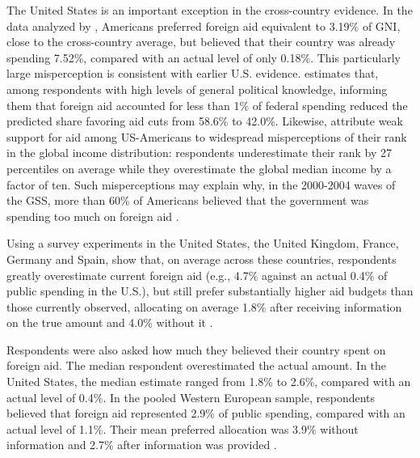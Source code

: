 \documentclass[11pt,a4paper]{article}
\begin{document}
The United States is an important exception in the cross-country evidence. In the data analyzed by \citet{kaufmann_foreign_2019}, Americans preferred foreign aid equivalent to 3.19\% of GNI, close to the cross-country average, but believed that their country was already spending 7.52\%, compared with an actual level of only 0.18\%. This particularly large misperception is consistent with earlier U.S. evidence. \citet{gilens_political_2001} estimates that, among respondents with high levels of general political knowledge, informing them that foreign aid accounted for less than 1\% of federal spending reduced the predicted share favoring aid cuts from 58.6\% to 42.0\%. Likewise, \citet{nair_misperceptions_2018} attribute weak support for aid among US-Americans to widespread misperceptions of their rank in the global income distribution: respondents underestimate their rank by 27 percentiles on average while they overestimate the global median income by a factor of ten. Such misperceptions may explain why, in the 2000-2004 waves of the GSS, more than 60\% of Americans believed that the government was spending too much on foreign aid \citep{okten_preferences_2007}.

Using a survey experiments in the United States, the United Kingdom, France, Germany and Spain, \citet{fabre_majority_2025} show that, on average across these countries,
respondents greatly overestimate current foreign aid (e.g., 4.7\% against an actual 0.4\% of public spending in the U.S.), but still prefer substantially higher aid budgets than those currently observed, allocating on average 1.8\% after receiving information on the true amount and 4.0\% without it \citet[Figure 8]{fabre_majority_2025_si}.

Respondents were also asked how much they believed their country spent on foreign aid. The median respondent overestimated the actual amount. In the United States, the median estimate ranged from 1.8\% to 2.6\%, compared with an actual level of 0.4\%. In the pooled Western European sample, respondents believed that foreign aid represented 2.9\% of public spending, compared with an actual level of 1.1\%. Their mean preferred allocation was 3.9\% without information and 2.7\% after information was provided \citep[Figure S20]{fabre_majority_2025_si}.
\end{document}
